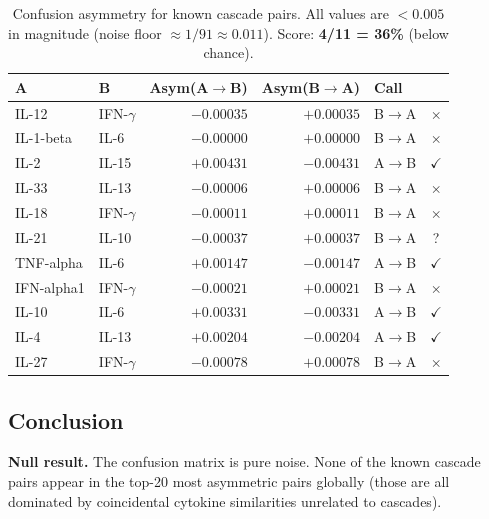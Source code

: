 \documentclass[11pt,a4paper]{article}
\begin{document}
\begin{table}[H]
\centering
\caption{Confusion asymmetry for known cascade pairs. All values are $< 0.005$ in magnitude (noise floor $\approx 1/91 \approx 0.011$). Score: \textbf{4/11 = 36\%} (below chance).}
\begin{tabular}{llrrl c}
\toprule
\textbf{A} & \textbf{B} & \textbf{Asym(A$\to$B)} & \textbf{Asym(B$\to$A)} & \textbf{Call} & \\
\midrule
IL-12      & IFN-$\gamma$ & $-0.00035$ & $+0.00035$ & B$\to$A & \textcolor{wrong}{$\times$} \\
IL-1-beta  & IL-6         & $-0.00000$ & $+0.00000$ & B$\to$A & \textcolor{wrong}{$\times$} \\
IL-2       & IL-15        & $+0.00431$ & $-0.00431$ & A$\to$B & \textcolor{correct}{$\checkmark$} \\
IL-33      & IL-13        & $-0.00006$ & $+0.00006$ & B$\to$A & \textcolor{wrong}{$\times$} \\
IL-18      & IFN-$\gamma$ & $-0.00011$ & $+0.00011$ & B$\to$A & \textcolor{wrong}{$\times$} \\
IL-21      & IL-10        & $-0.00037$ & $+0.00037$ & B$\to$A & \textcolor{marginal}{?} \\
TNF-alpha  & IL-6         & $+0.00147$ & $-0.00147$ & A$\to$B & \textcolor{correct}{$\checkmark$} \\
IFN-alpha1 & IFN-$\gamma$ & $-0.00021$ & $+0.00021$ & B$\to$A & \textcolor{wrong}{$\times$} \\
IL-10      & IL-6         & $+0.00331$ & $-0.00331$ & A$\to$B & \textcolor{correct}{$\checkmark$} \\
IL-4       & IL-13        & $+0.00204$ & $-0.00204$ & A$\to$B & \textcolor{correct}{$\checkmark$} \\
IL-27      & IFN-$\gamma$ & $-0.00078$ & $+0.00078$ & B$\to$A & \textcolor{wrong}{$\times$} \\
\bottomrule
\end{tabular}
\end{table}

\subsection{Conclusion}

\textbf{Null result.} The confusion matrix is pure noise. None of the known
cascade pairs appear in the top-20 most asymmetric pairs globally (those are
all dominated by coincidental cytokine similarities unrelated to cascades).
\end{document}
